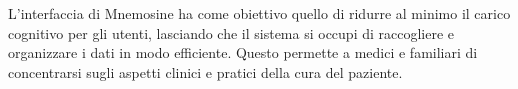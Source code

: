 \documentclass[a4paper,12pt]{book}
\begin{document}
	L'interfaccia di Mnemosine ha come obiettivo quello di ridurre al minimo il carico cognitivo per gli utenti, lasciando che il sistema si occupi di raccogliere e organizzare i dati in modo efficiente. Questo permette a medici e familiari di concentrarsi sugli aspetti clinici e pratici della cura del paziente.
	
\end{document}
